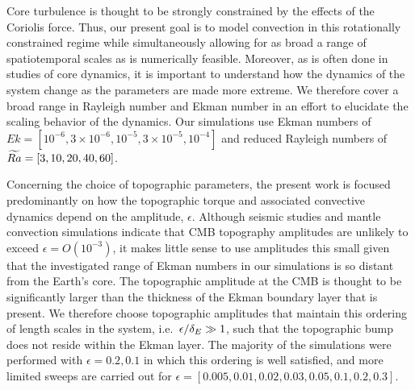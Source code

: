 Core turbulence is thought to be strongly constrained by the effects of the Coriolis force. 
Thus, our present goal is to model convection in this rotationally constrained regime while simultaneously allowing for as broad a range of spatiotemporal scales as is numerically feasible. 
Moreover, as is often done in studies of core dynamics, it is important to understand how the dynamics of the system change as the parameters are made more extreme. 
We therefore cover a broad range in Rayleigh number and Ekman number in an effort to elucidate the scaling behavior of the dynamics. 
Our simulations use Ekman numbers of $Ek = [10^{-6}, 3 \times 10^{-6}, 10^{-5}, 3 \times 10^{-5}, 10^{-4}]$ and reduced Rayleigh numbers of $\widetilde{Ra} = [3, 10, 20, 40, 60]$. 

Concerning the choice of topographic parameters, the present work is focused predominantly on how the topographic torque and associated convective dynamics depend on the amplitude, $\epsilon$. 
Although seismic studies and mantle convection simulations indicate that CMB topography amplitudes are unlikely to exceed $\epsilon = O(10^{-3})$, it makes little sense to use amplitudes this small given that the investigated range of Ekman numbers in our simulations is so distant from the Earth's core.
\textcolor{\revtxt}{The topographic amplitude at the CMB is thought to be significantly larger than the thickness of the Ekman boundary layer that is present. 
We therefore choose topographic amplitudes that maintain this ordering of length scales in the system, i.e.~$\epsilon/\delta_E \gg 1$, such that the topographic bump does not reside within the Ekman layer.}
\textcolor{\revtxt}{The majority of the simulations were performed with $\epsilon  = 0.2, 0.1$ in which this ordering is well satisfied, and more limited sweeps are carried out for $\epsilon  = [0.005,0.01,0.02,0.03,0.05,0.1,0.2,0.3].$ }


